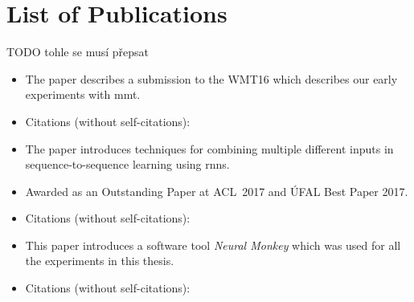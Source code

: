 \chapter*{List of Publications}

TODO tohle se musí přepsat



\noindent{}
\begin{itemize}[noitemsep,topsep=0pt]

    \item The paper describes a submission to the WMT16 which describes our early
        experiments with \gls{mmt}.

    \item Citations (without self-citations): 

\end{itemize}\vspace{3mm}


\noindent{}
\begin{itemize}[noitemsep,topsep=0pt]

  \item The paper introduces techniques for combining multiple different inputs in
    sequence-to-sequence learning using \glspl{rnn}.

  \item Awarded as an Outstanding Paper at ACL~2017 and ÚFAL Best Paper 2017.

  \item Citations (without self-citations): 

\end{itemize}\vspace{3mm}


\noindent{}
\begin{itemize}[noitemsep,topsep=0pt]

  \item This paper introduces a software tool \emph{Neural Monkey} which was
      used for all the experiments in this thesis.

  \item Citations (without self-citations): 

\end{itemize}\vspace{3mm}

